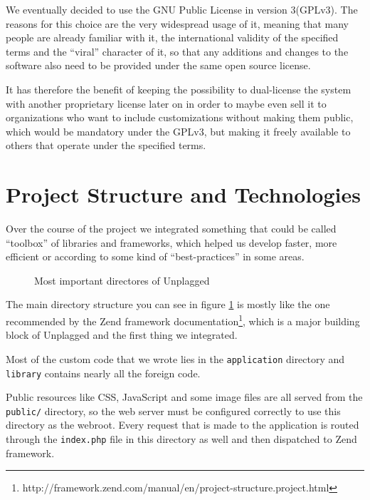 We eventually decided to use the GNU Public License in version 3(GPLv3). The reasons for this choice are the very widespread usage of it, meaning that many people are already 
familiar with it, the international validity of the specified terms and the \enquote{viral}
character of it, so that any additions and changes to the software also need to be provided 
under the same open source license.

It has therefore the benefit of keeping the possibility to dual-license the system with another proprietary license later on in order to maybe even sell it to organizations who want to include
customizations without making them public, which would be mandatory under the GPLv3, but making it freely available to others that operate under the specified terms.

\section{Project Structure and Technologies}

Over the course of the project we integrated something that could be called \enquote{toolbox} of libraries and frameworks, which 
helped us develop faster, more efficient or according to some kind of \enquote{best-practices}
in some areas.

\begin{figure}[!h]
\caption{Most important directores of Unplagged}
  \label{fig:directoryStructure}
\end{figure}

The main directory structure you can see in figure \ref{fig:directoryStructure} is mostly like the one recommended by the Zend framework documentation\footnote{http://framework.zend.com/manual/en/project-structure.project.html}, which is a major building block of 
Unplagged and the first thing we integrated.

Most of the custom code that we wrote lies in the \texttt{application} directory and \texttt{library} contains nearly all the foreign code.

Public resources like CSS, JavaScript and some image files are all served from the \texttt{public/} directory, so the web server must be configured correctly to use this directory as the webroot. Every request that is made to the application is routed through the \texttt{index.php} file in this directory as well and then dispatched to Zend framework.

